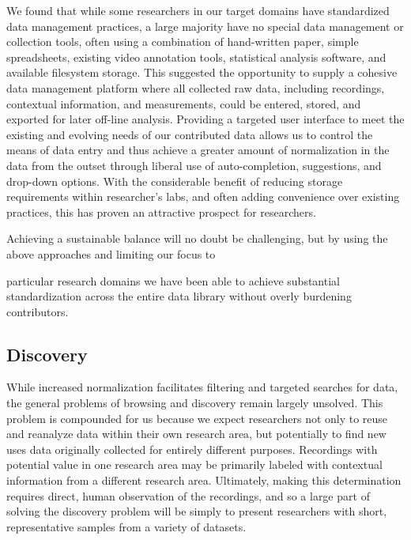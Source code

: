 \documentclass{sig-alternate}
\begin{document}
We found that while some researchers in our target domains have standardized data management practices, a large majority have no special data management or collection tools, often using a combination of hand-written paper, simple spreadsheets, existing video annotation tools, statistical analysis software, and available filesystem storage.
This suggested the opportunity to supply a cohesive data management platform where all collected raw data, including recordings, contextual information, and measurements, could be entered, stored, and exported for later off-line analysis.
Providing a targeted user interface to meet the existing and evolving needs of our contributed data allows us to control the means of data entry and thus achieve a greater amount of normalization in the data from the outset through liberal use of auto-completion, suggestions, and drop-down options.
With the considerable benefit of reducing storage requirements within researcher's labs, and often adding convenience over existing practices, this has proven an attractive prospect for researchers.

Achieving a sustainable balance will no doubt be challenging, but by using the above approaches and limiting our focus to 

particular research domains we have been able to achieve substantial standardization across the entire data library without overly burdening contributors.

\subsection{Discovery}

While increased normalization facilitates filtering and targeted searches for data, the general problems of browsing and discovery remain largely unsolved.
This problem is compounded for us because we expect researchers not only to reuse and reanalyze data within their own research area, but potentially to find new uses data originally collected for entirely different purposes.
Recordings with potential value in one research area may be primarily labeled with contextual information from a different research area.
Ultimately, making this determination requires direct, human observation of the recordings, and so a large part of solving the discovery problem will be simply to present researchers with short, representative samples from a variety of datasets.
\end{document}

